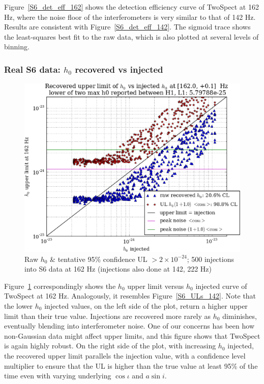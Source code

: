 Figure~\ref{S6_det_eff_162} shows the detection efficiency curve of TwoSpect at 162 Hz, where the noise floor of the interferometers is very similar to that of 142 Hz. 
Results are consistent with Figure~\ref{S6_det_eff_142}.
The sigmoid trace shows the least-squares best fit to the raw data, which is also plotted at several levels of binning.

\subsubsection{Real S6 data: $h_0$ recovered vs injected}

\begin{figure}
\begin{center}
\includegraphics[width=0.70\paperwidth,height=0.48\paperheight]{plots/h0UL-vs-h0injected-162-0Hz.eps}
\caption{
Raw $h_0$ \& tentative 95\% confidence UL $>2\times10^{-24}$; 500 injections
into S6 data at 162 Hz (injections also done at 142, 222 Hz)}
\label{S6_ULs_162}
\end{center}
\end{figure}


Figure~\ref{S6_ULs_162} correspondingly shows the $h_0$ upper limit versus $h_0$ injected curve of TwoSpect at 162 Hz.
Analogously, it resembles Figure~\ref{S6_ULs_142}.
Note that the lower $h_0$ injected values, on the left side of the plot, return a higher upper limit than their true value.
Injections are recovered more rarely as $h_0$ diminishes, eventually blending into interferometer noise.
One of our concerns has been how non-Gaussian data might affect upper limits, and this figure shows that TwoSpect is again highly robust.
On the right side of the plot, with increasing $h_0$ injected, the recovered upper limit parallels the injection value, with a confidence level multiplier to ensure that the UL is higher than the true value at least 95\% of the time even with varying underlying $\cos \iota$ and $a \sin i$.


